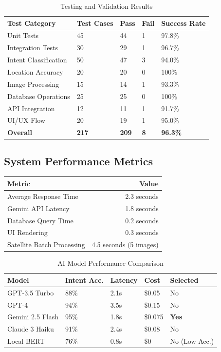 \documentclass[11pt,a4paper]{article}
\begin{document}
\begin{table}[H]
\centering
\caption{Testing and Validation Results}
\label{tab:testing}
\begin{tabular}{|l|l|l|l|l|}
\hline
\textbf{Test Category} & \textbf{Test Cases} & \textbf{Pass} & \textbf{Fail} & \textbf{Success Rate} \\
\hline
Unit Tests & 45 & 44 & 1 & 97.8\% \\
Integration Tests & 30 & 29 & 1 & 96.7\% \\
Intent Classification & 50 & 47 & 3 & 94.0\% \\
Location Accuracy & 20 & 20 & 0 & 100\% \\
Image Processing & 15 & 14 & 1 & 93.3\% \\
Database Operations & 25 & 25 & 0 & 100\% \\
API Integration & 12 & 11 & 1 & 91.7\% \\
UI/UX Flow & 20 & 19 & 1 & 95.0\% \\
\hline
\textbf{Overall} & \textbf{217} & \textbf{209} & \textbf{8} & \textbf{96.3\%} \\
\hline
\end{tabular}
\end{table}

\subsection{System Performance Metrics}

\begin{table}[H]
\centering
\begin{tabular}{|l|r|}
\hline
\textbf{Metric} & \textbf{Value} \\
\hline
Average Response Time & 2.3 seconds \\
Gemini API Latency & 1.8 seconds \\
Database Query Time & 0.2 seconds \\
UI Rendering & 0.3 seconds \\
Satellite Batch Processing & 4.5 seconds (5 images) \\
\hline
\end{tabular}
\end{table}

\begin{table}[H]
\centering
\caption{AI Model Performance Comparison}
\label{tab:model_comparison}
\begin{tabular}{|l|l|l|l|l|}
\hline
\textbf{Model} & \textbf{Intent Acc.} & \textbf{Latency} & \textbf{Cost} & \textbf{Selected} \\
\hline
GPT-3.5 Turbo & 88\% & 2.1s & \$0.05 & No \\
GPT-4 & 94\% & 3.5s & \$0.15 & No \\
Gemini 2.5 Flash & 95\% & 1.8s & \$0.075 & \textbf{Yes} \\
Claude 3 Haiku & 91\% & 2.4s & \$0.08 & No \\
Local BERT & 76\% & 0.8s & \$0 & No (Low Acc.) \\
\hline
\end{tabular}
\end{table}
\end{document}
